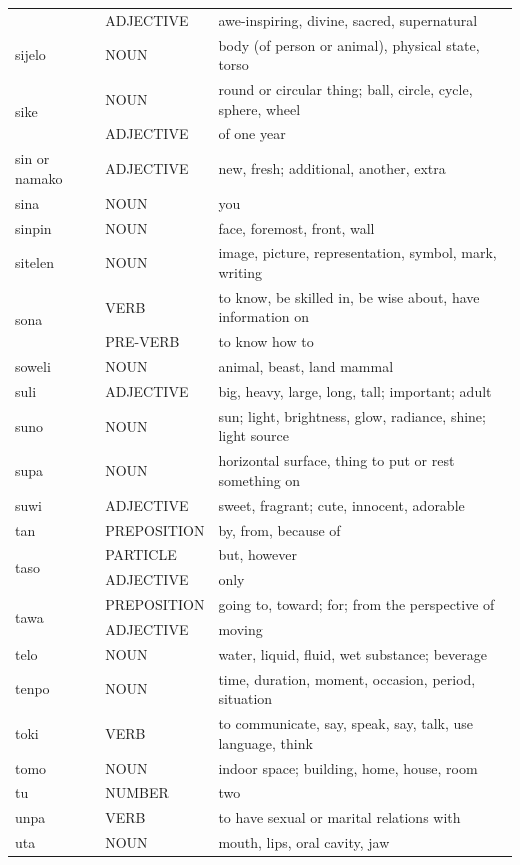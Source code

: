 \documentclass[14pt, a4paper]{extreport}
\begin{document}
\begin{longtable}{llp{10cm}}
  & ADJECTIVE & awe-inspiring, divine, sacred, supernatural \\
  sijelo & NOUN & body (of person or animal), physical state, torso \\
  \multirow[t]{2}{*}{sike} & NOUN & round or circular thing; ball, circle, cycle, sphere, wheel \\
  & ADJECTIVE & of one year \\
  sin or namako & ADJECTIVE & new, fresh; additional, another, extra \\
  sina & NOUN & you \\
  sinpin & NOUN & face, foremost, front, wall \\
  sitelen & NOUN & image, picture, representation, symbol, mark, writing \\
  \multirow[t]{2}{*}{sona} & VERB & to know, be skilled in, be wise about, have information on \\
  & PRE-VERB & to know how to \\
  soweli & NOUN & animal, beast, land mammal \\
  suli & ADJECTIVE & big, heavy, large, long, tall; important; adult \\
  suno & NOUN & sun; light, brightness, glow, radiance, shine; light source \\
  supa & NOUN & horizontal surface, thing to put or rest something on \\
  suwi & ADJECTIVE & sweet, fragrant; cute, innocent, adorable \\
  tan & PREPOSITION & by, from, because of \\
  \multirow[t]{2}{*}{taso} & PARTICLE & but, however \\
  & ADJECTIVE & only \\
  \multirow[t]{2}{*}{tawa} & PREPOSITION & going to, toward; for; from the perspective of \\
  & ADJECTIVE & moving \\
  telo & NOUN & water, liquid, fluid, wet substance; beverage \\
  tenpo & NOUN & time, duration, moment, occasion, period, situation \\
  toki & VERB & to communicate, say, speak, say, talk, use language, think \\
  tomo & NOUN & indoor space; building, home, house, room \\
  tu & NUMBER & two \\
  unpa & VERB & to have sexual or marital relations with \\
  uta & NOUN & mouth, lips, oral cavity, jaw \\

\end{longtable}
\end{document}
